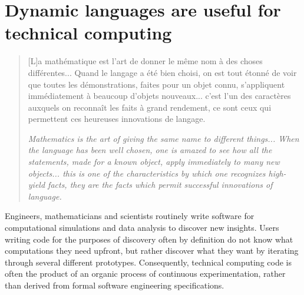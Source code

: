 \documentclass[pldi]{sigplanconf-pldi15}
\begin{document}

\tableofcontents %

\section{Dynamic languages are useful for technical computing}

\begin{quote}
	[L]a math\'ematique est l'art de donner le m\^eme nom \`a des choses
	diff\'erentes... Quand le langage a \'et\'e bien choisi, on est tout
	\'etonn\'e de voir que toutes les d\'emonstrations, faites pour un
	objet connu, s'appliqu\-ent imm\'ediatement \`a beaucoup d'objets
	nouveaux... c'est l'un des caract\`eres auxquels on reconna\^it les
	faits \`a grand rendement, ce sont ceux qui permettent ces heureuses
	innovations de langage. \cite{Poincare1908}
	
	\textit{Mathematics is the art of giving the same name to different
	things... When the language has been well chosen, one is amazed to see
	how all the statements, made for a known object, apply immediately
	to many new objects... this is one of the characteristics by which one
	recognizes high-yield facts, they are the facts which permit successful
	innovations of language.}
\end{quote}

Engineers, mathematicians and scientists routinely write software for
computational simulations and data analysis to discover new insights.
Users writing code for the purposes of discovery often by definition do not
know what computations they need upfront, but rather discover what they want by
iterating through several different prototypes. Consequently, technical
computing code is often the product of an organic process of continuous
experimentation, rather than derived from formal software engineering
specifications.
\end{document}
